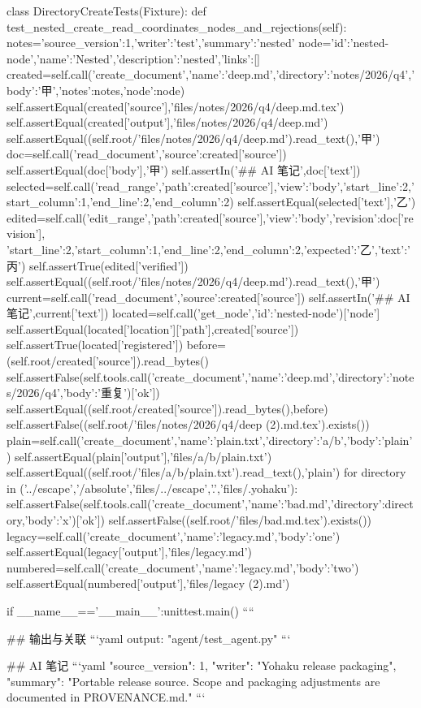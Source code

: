 class DirectoryCreateTests(Fixture):
    def test_nested_create_read_coordinates_nodes_and_rejections(self):
        notes={'source_version':1,'writer':'test','summary':'nested'}
        node={'id':'nested-node','name':'Nested','description':'nested','links':[]}
        created=self.call('create_document',{'name':'deep.md','directory':'notes/2026/q4','body':'甲\n','notes':notes,'node':node})
        self.assertEqual(created['source'],'files/notes/2026/q4/deep.md.tex')
        self.assertEqual(created['output'],'files/notes/2026/q4/deep.md')
        self.assertEqual((self.root/'files/notes/2026/q4/deep.md').read_text(),'甲\n')
        doc=self.call('read_document',{'source':created['source']})
        self.assertEqual(doc['body'],'甲\n')
        self.assertIn('## AI 笔记',doc['text'])
        selected=self.call('read_range',{'path':created['source'],'view':'body','start_line':2,'start_column':1,'end_line':2,'end_column':2})
        self.assertEqual(selected['text'],'乙')
        edited=self.call('edit_range',{'path':created['source'],'view':'body','revision':doc['revision'],
            'start_line':2,'start_column':1,'end_line':2,'end_column':2,'expected':'乙','text':'丙'})
        self.assertTrue(edited['verified'])
        self.assertEqual((self.root/'files/notes/2026/q4/deep.md').read_text(),'甲\n')
        current=self.call('read_document',{'source':created['source']})
        self.assertIn('## AI 笔记',current['text'])
        located=self.call('get_node',{'id':'nested-node'})['node']
        self.assertEqual(located['location']['path'],created['source'])
        self.assertTrue(located['registered'])
        before=(self.root/created['source']).read_bytes()
        self.assertFalse(self.tools.call('create_document',{'name':'deep.md','directory':'notes/2026/q4','body':'重复'})['ok'])
        self.assertEqual((self.root/created['source']).read_bytes(),before)
        self.assertFalse((self.root/'files/notes/2026/q4/deep (2).md.tex').exists())
        plain=self.call('create_document',{'name':'plain.txt','directory':'a/b','body':'plain\n'})
        self.assertEqual(plain['output'],'files/a/b/plain.txt')
        self.assertEqual((self.root/'files/a/b/plain.txt').read_text(),'plain\n')
        for directory in ('../escape','/absolute','files/../escape','.','files/.yohaku'):
            self.assertFalse(self.tools.call('create_document',{'name':'bad.md','directory':directory,'body':'x'})['ok'])
        self.assertFalse((self.root/'files/bad.md.tex').exists())
        legacy=self.call('create_document',{'name':'legacy.md','body':'one'})
        self.assertEqual(legacy['output'],'files/legacy.md')
        numbered=self.call('create_document',{'name':'legacy.md','body':'two'})
        self.assertEqual(numbered['output'],'files/legacy (2).md')


if __name__=='__main__':unittest.main()
````

## 输出与关联
```yaml
output: "agent/test_agent.py"
```

## AI 笔记
```yaml
{"source_version": 1, "writer": "Yohaku release packaging", "summary": "Portable release source. Scope and packaging adjustments are documented in PROVENANCE.md."}
```
